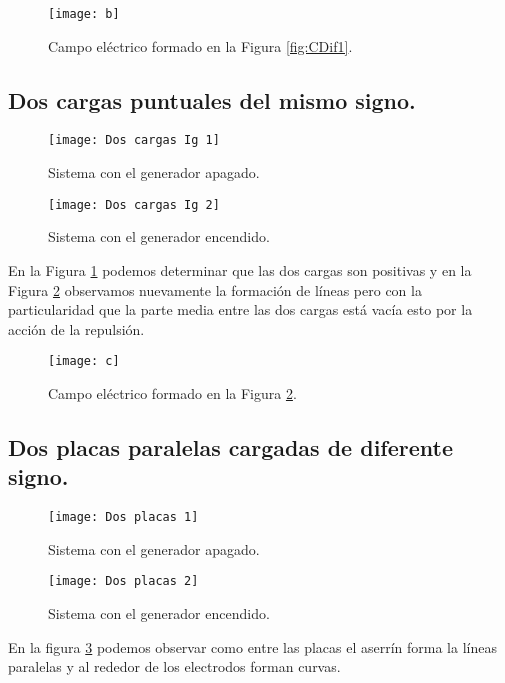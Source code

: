 \documentclass[14pt]{article}
\begin{document}
\begin{multicols}{2}
\begin{figure}[h!]
	\centering
	\texttt{[image: b]}
	\caption{Campo eléctrico formado en la Figura \ref{fig:CDif1}.}
	
\end{figure}


\subsection{Dos cargas puntuales del mismo signo.}

\begin{figure}[h!]
	\centering
	\texttt{[image: Dos cargas Ig 1]}
	\caption{Sistema con el generador apagado.}
	\label{fig:2CarIA}
\end{figure}

\begin{figure}[h!]
	\centering
	\texttt{[image: Dos cargas Ig 2]}
	\caption{Sistema con el generador encendido.}
	\label{fig:2CarI}
\end{figure}

En la Figura \ref{fig:2CarIA} podemos determinar que las dos cargas son positivas y en la Figura \ref{fig:2CarI} observamos nuevamente la formación de líneas pero con la particularidad que la parte media entre las dos cargas está vacía esto por la acción de la repulsión.

\begin{figure}
	\centering
	\texttt{[image: c]}
	\caption{Campo eléctrico formado en la Figura \ref{fig:2CarI}.}
\end{figure}

\subsection{Dos placas paralelas cargadas de diferente signo.}

\begin{figure}[h!]
	\centering
	\texttt{[image: Dos placas 1]}
	\caption{Sistema con el generador apagado.}
\end{figure}

\begin{figure}[h!]
	\centering
	\texttt{[image: Dos placas 2]}
	\caption{Sistema con el generador encendido.}
	\label{fig:DosPlacas}
\end{figure}

En la figura \ref{fig:DosPlacas} podemos observar como entre las placas el aserrín forma la líneas paralelas y al rededor de los electrodos forman curvas.


\end{multicols}
\end{document}
